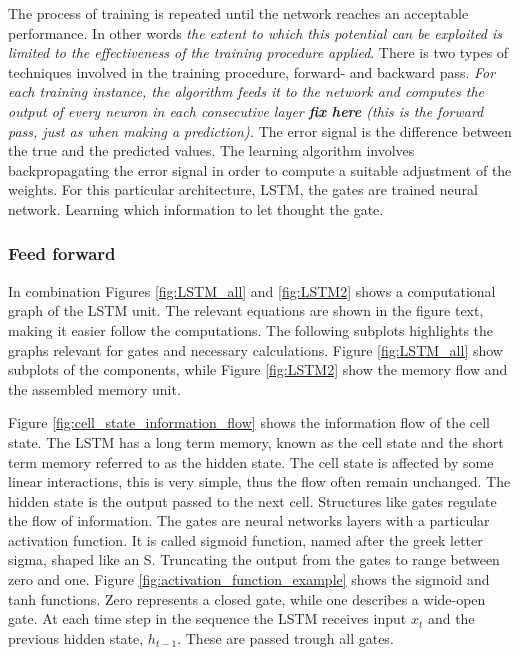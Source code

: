 \documentclass{article}
\begin{document}
The process of training is repeated until the network reaches an acceptable performance. In other words \textit{the extent to which this potential can be exploited is limited to the effectiveness of the training procedure applied}. There is two types of techniques involved in the training procedure, forward- and backward pass. \textit{For each training instance, the algorithm feeds it to the network and computes the output of every neuron in each consecutive layer \textbf{fix here} (this is the forward pass, just as when making a prediction).} 
The error signal is the difference between the true and the predicted values. The learning algorithm involves backpropagating the error signal in order to compute a suitable adjustment of the weights. For this particular architecture, LSTM, the gates are trained neural network. Learning which information to let thought the gate.

\subsubsection{Feed forward} \label{sec:forward_pass_lstm}


In combination Figures \ref{fig:LSTM_all} and \ref{fig:LSTM2} shows a computational graph of the LSTM unit. The relevant equations are shown in the figure text, making it easier follow the computations. The following subplots highlights the graphs relevant for gates and necessary calculations. 
Figure \ref{fig:LSTM_all} show subplots of the components, while Figure \ref{fig:LSTM2} show the memory flow and the assembled memory unit.

Figure \ref{fig:cell_state_information_flow} shows the information flow of the cell state. The LSTM has a long term memory, known as the cell state and the short term memory referred to as the hidden state. The cell state is affected by some linear interactions, this is very simple, thus the flow often remain unchanged. The hidden state is the output passed to the next cell. Structures like gates regulate the flow of information. The gates are neural networks layers with a particular activation function. It is called sigmoid function, named after the greek letter sigma, shaped like an S. Truncating the output from the gates to range between zero and one. Figure \ref{fig:activation_function_example} shows the sigmoid and tanh functions. Zero represents a closed gate, while one describes a wide-open gate. At each time step in the sequence the LSTM receives input $x_t$ and the previous hidden state, $h_{t-1}$. These are passed trough all gates. 
\end{document}
